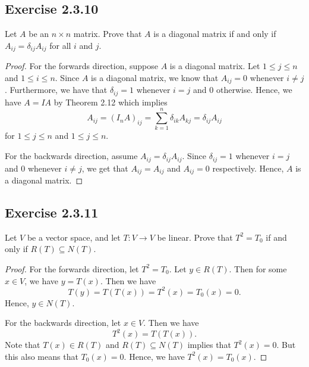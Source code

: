 \subsection*{Exercise 2.3.10} Let \( A  \) be an \( n \times n  \) matrix. Prove that \( A  \) is a diagonal matrix if and only if \( {A}_{ij} = {\delta}_{ij} {A}_{ij}  \) for all \( i  \) and \( j \).
\begin{proof}
For the forwards direction, suppose \( A  \) is a diagonal matrix. Let \( 1 \leq j \leq  n   \) and \(  1 \leq i \leq  n  \). Since \( A  \) is a diagonal matrix, we know that \( {A}_{ij} = 0  \) whenever \( i \neq j  \). Furthermore, we have that \( {\delta}_{ij} = 1  \) whenever \( i  = j  \) and \(  0  \) otherwise. Hence, we have \( A = IA  \) by Theorem 2.12 which implies 
\[  {A}_{ij} = {({I}_{n} A )}_{ij} = \sum_{ k=1}^{ n } {\delta}_{ik } {A}_{kj } = {\delta}_{ij} {A}_{ij} \]
for \( 1 \leq j \leq n \) and \( 1 \leq j \leq n \).

For the backwards direction, assume \( {A}_{ij} = {\delta}_{ij} {A}_{ij}  \). Since \( {\delta}_{ij} = 1   \) whenever \( i = j  \) and \( 0  \) whenever \(  i \neq j  \), we get that  \( {A}_{ij} = {A}_{ij}  \) and \( {A}_{ij} = 0  \) respectively. Hence, \( A  \) is a diagonal matrix.

\end{proof}

\subsection*{Exercise 2.3.11} Let \( V  \) be a vector space, and let \( T: V \to V  \) be linear. Prove that \( T^{2} = {T}_{0} \) if and only if \( R(T) \subseteq N(T) \).
\begin{proof}
For the forwards direction, let \( T^{2} = {T}_{0}  \). Let \( y \in R(T)  \). Then for some \( x \in V  \), we have \( y = T(x) \). Then we have
\[
    T(y) = T(T(x)) 
         = T^{2}(x) 
         = {T}_{0}(x) 
         = 0.
\]
Hence, \( y \in N(T) \).

For the backwards direction, let \( x \in V  \). Then we have 
\[  T^{2}(x) = T(T(x)). \]
Note that \( T(x) \in R(T)   \) and \( R(T) \subseteq N(T)  \) implies that \( T^{2}(x) = 0  \). But this also means that \( {T}_{0}(x) = 0  \). Hence, we have \( T^{2}(x) = {T}_{0}(x) \).


\end{proof}


